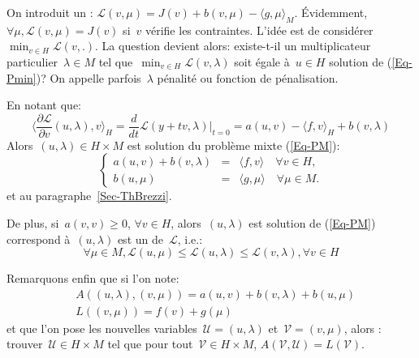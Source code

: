 \medskip
On introduit un :
$\mathscr{L}(v,\mu) = J(v)+b(v,\mu) - \langle g,\mu\rangle_M$.
Évidemment, $\forall\mu, \mathscr{L}(v,\mu)=J(v)$ si~$v$ vérifie les contraintes.
L'idée est de considérer~$\min_{v\in H} \mathscr{L}(v,.)$.
La question devient alors: existe-t-il un multiplicateur particulier~$\lambda\in M$ tel que~$\min_{v\in H} \mathscr{L}(v,\lambda)$ soit égale à~$u\in H$ solution de (\ref{Eq-Pmin})?
On appelle parfois~$\lambda$ pénalité ou fonction de pénalisation.

\medskip
En notant que:
\begin{equation}\langle\frac{\partial\mathscr{L}}{\partial v}(u,\lambda),v\rangle_H
=\frac d{dt}\mathscr{L}(y+tv,\lambda)|_{t=0}
=a(u,v)-\langle f,v\rangle_H+b(v,\lambda)
\end{equation}
Alors~$(u,\lambda) \in H\times M$ est solution du problème mixte (\ref{Eq-PM}):
 \begin{equation}\left\{
\begin{array}{rcl}
 a(u,v) + b(v, \lambda) &=& \langle f,v\rangle \quad \forall v\in H,\\
b(u,\mu) &=& \langle g,\mu\rangle \quad \forall \mu \in M.
\end{array}\right.
\end{equation}
et  au paragraphe~\ref{Sec-ThBrezzi}.

\medskip
De plus, si~$a(v,v)\ge 0$, $\forall v\in H$, alors~$(u,\lambda)$ est solution de (\ref{Eq-PM}) correspond à~$(u,\lambda)$ est un  de~$\mathscr{L}$, i.e.:
\begin{equation}
\forall\mu\in M, \mathscr{L}(u,\mu) \le \mathscr{L}(u,\lambda) \le
\mathscr{L}(v,\lambda), \forall v\in H
\end{equation}

\medskip
Remarquons enfin que si l'on note:
\begin{align}&A((u,\lambda),(v,\mu))=a(u,v)+b(v,\lambda)+b(u,\mu)\\
&L((v,\mu))=f(v)+g(\mu)\end{align}
et que l'on pose les nouvelles variables~$\mathscr{U}=(u,\lambda)$ et~$\mathscr{V}=(v,\mu)$, alors : trouver~$\mathscr{U}\in H\times M$
tel que pour tout~$\mathscr{V}\in H\times M$, $A(\mathscr{V},\mathscr{U})=L(\mathscr{V})$.

